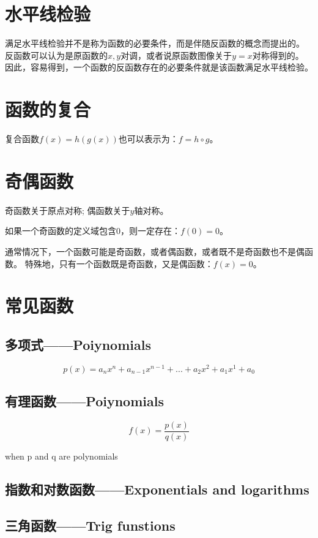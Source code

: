 \documentclass[11pt, b5paper, oneside]{book}
\begin{document}
\section{水平线检验}

满足水平线检验并不是称为函数的必要条件，而是伴随反函数的概念而提出的。
反函数可以认为是原函数的$x,y$对调，或者说原函数图像关于$y=x$对称得到的。
因此，容易得到，一个函数的反函数存在的必要条件就是该函数满足水平线检验。

\section{函数的复合}

复合函数$f(x)=h(g(x))$也可以表示为：$f=h\circ g$。

\section{奇偶函数}

奇函数关于原点对称;
偶函数关于$y$轴对称。

如果一个奇函数的定义域包含0，则一定存在：$f(0)=0$。

通常情况下，一个函数可能是奇函数，或者偶函数，或者既不是奇函数也不是偶函数。
特殊地，只有一个函数既是奇函数，又是偶函数：$f(x)=0$。

\section{常见函数}

\subsection{多项式——Poiynomials}
\[
    p(x)=a_nx^n+a_{n-1}x^{n-1}+...+a_2x^2+a_1x^1+a_0
\]

\subsection{有理函数——Poiynomials}
\[
    f(x)=\frac{p(x)}{q(x)}
\]
\centerline{when p and q are polynomials}

\subsection{指数和对数函数——Exponentials and logarithms}

\subsection{三角函数——Trig funstions}
\end{document}
